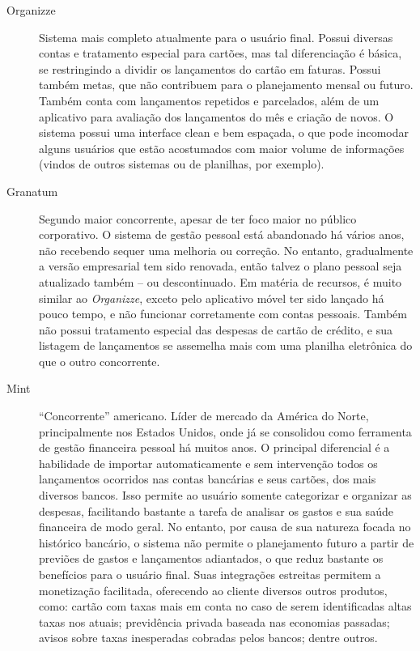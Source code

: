 \documentclass[a4paper]{abnt}
\begin{document}
\begin{description}
	\item[Organizze] Sistema mais completo atualmente para o usuário final. Possui diversas contas e tratamento especial para cart\~oes, mas tal diferenciaç\~ao é básica, se restringindo a dividir os lançamentos do cart\~ao em faturas. Possui também metas, que n\~ao contribuem para o planejamento mensal ou futuro. Também conta com lançamentos repetidos e parcelados, além de um aplicativo para avaliaç\~ao dos lançamentos do mês e criaç\~ao de novos. O sistema possui uma interface clean e bem espaçada, o que pode incomodar alguns usuários que est\~ao acostumados com maior volume de informaç\~oes (vindos de outros sistemas ou de planilhas, por exemplo).
	
	\item[Granatum] Segundo maior concorrente, apesar de ter foco maior no público corporativo. O sistema de gest\~ao pessoal est\'a abandonado h\'a v\'arios anos, n\~ao recebendo sequer uma melhoria ou correç\~ao. No entanto, gradualmente a vers\~ao empresarial tem sido renovada, ent\~ao talvez o plano pessoal seja atualizado tamb\'em -- ou descontinuado. Em matéria de recursos, é muito similar ao \emph{Organizze}, exceto pelo aplicativo móvel ter sido lançado h\'a pouco tempo, e n\~ao funcionar corretamente com contas pessoais. Também n\~ao possui tratamento especial das despesas de cart\~ao de crédito, e sua listagem de lançamentos se assemelha mais com uma planilha eletr\^onica do que o outro concorrente.
	
	\item[Mint] ``Concorrente'' americano. Líder de mercado da América do Norte, principalmente nos Estados Unidos, onde já se consolidou como ferramenta de gest\~ao financeira pessoal há muitos anos. O principal diferencial é a habilidade de importar automaticamente e sem intervenç\~ao todos os lançamentos ocorridos nas contas bancárias e seus cart\~oes, dos mais diversos bancos. Isso permite ao usuário somente categorizar e organizar as despesas, facilitando bastante a tarefa de analisar os gastos e sua saúde financeira de modo geral. No entanto, por causa de sua natureza focada no histórico bancário, o sistema n\~ao permite o planejamento futuro a partir de previ\~oes de gastos e lançamentos adiantados, o que reduz bastante os benefícios para o usuário final. Suas integraç\~oes estreitas permitem a monetizaç\~ao facilitada, oferecendo ao cliente diversos outros produtos, como: cart\~ao com taxas mais em conta no caso de serem identificadas altas taxas nos atuais; previd\^encia privada baseada nas economias passadas; avisos sobre taxas inesperadas cobradas pelos bancos; dentre outros.
	

\end{description}
\end{document}
